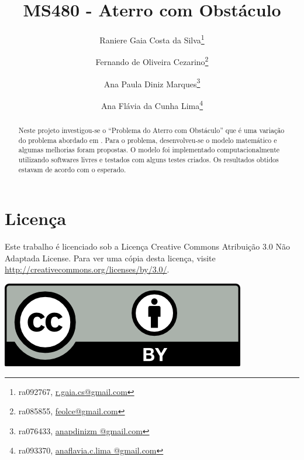 \documentclass[12pt,a4paper]{article}
\begin{document}
\title{MS480 - Aterro com Obst\'{a}culo}
\author{Raniere Gaia Costa da Silva\footnote{ra092767,
\url{r.gaia.cs@gmail.com}} \and Fernando de Oliveira Cezarino\footnote{ra085855,
\url{feolce@gmail.com}} \and Ana Paula Diniz Marques\footnote{ra076433,
\url{anapdinizm @gmail.com}} \and  Ana Flávia da Cunha Lima\footnote{ra093370,
\url{anaflavia.c.lima @gmail.com}}}
\maketitle
\begin{abstract}
    Neste projeto investigou-se o ``Problema do Aterro com Obstáculo'' que é uma
    variação do problema abordado em \cite{Andjel:1989:TP}. Para o problema,
    desenvolveu-se o modelo matemático e algumas melhorias foram propostas.
    O modelo foi implementado computacionalmente utilizando softwares livres e
    testados com alguns testes criados. Os resultados obtidos estavam de acordo
    com o esperado.
\end{abstract}
\section*{Licen\c{c}a}
Este trabalho \'{e} licenciado sob a Licen\c{c}a Creative Commons
Atribui\c{c}\~{a}o 3.0 N\~{a}o Adaptada License. Para ver uma c\'{o}pia desta
licen\c{c}a, visite \url{http://creativecommons.org/licenses/by/3.0/}.
\begin{center}
    \includegraphics{../figuras/cc-by.png}
\end{center}
\newpage
\tableofcontents
\newpage







\appendix

%








\end{document}
